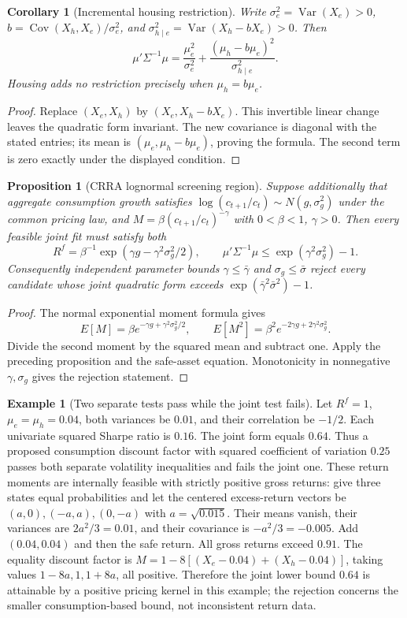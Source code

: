 \documentclass[11pt]{article}
\newtheorem{proposition}{Proposition}
\newtheorem{corollary}{Corollary}
\theoremstyle{definition}
\newtheorem{example}{Example}
\begin{document}
\begin{corollary}[Incremental housing restriction]
Write $\sigma_e^2=\operatorname{Var}(X_e)>0$, $b=\operatorname{Cov}(X_h,X_e)/\sigma_e^2$, and $\sigma_{h\mid e}^2=\operatorname{Var}(X_h-bX_e)>0$. Then
\[
 \mu'\Sigma^{-1}\mu
 =\frac{\mu_e^2}{\sigma_e^2}
   +\frac{(\mu_h-b\mu_e)^2}{\sigma_{h\mid e}^2}.
\]
Housing adds no restriction precisely when $\mu_h=b\mu_e$.
\end{corollary}
\begin{proof}
Replace $(X_e,X_h)$ by $(X_e,X_h-bX_e)$. This invertible linear change leaves the quadratic form invariant. The new covariance is diagonal with the stated entries; its mean is $(\mu_e,\mu_h-b\mu_e)$, proving the formula. The second term is zero exactly under the displayed condition.
\end{proof}

\begin{proposition}[CRRA lognormal screening region]
Suppose additionally that aggregate consumption growth satisfies $\log(c_{t+1}/c_t)\sim N(g,\sigma_g^2)$ under the common pricing law, and $M=\beta(c_{t+1}/c_t)^{-\gamma}$ with $0<\beta<1$, $\gamma>0$. Then every feasible joint fit must satisfy both
\[
 R^f=\beta^{-1}\exp(\gamma g-\gamma^2\sigma_g^2/2),
 \qquad
 \mu'\Sigma^{-1}\mu\leq\exp(\gamma^2\sigma_g^2)-1.
\]
Consequently independent parameter bounds $\gamma\leq\bar\gamma$ and $\sigma_g\leq\bar\sigma$ reject every candidate whose joint quadratic form exceeds $\exp(\bar\gamma^2\bar\sigma^2)-1$.
\end{proposition}
\begin{proof}
The normal exponential moment formula gives
\[
 E[M]=\beta e^{-\gamma g+\gamma^2\sigma_g^2/2},\qquad
 E[M^2]=\beta^2e^{-2\gamma g+2\gamma^2\sigma_g^2}.
\] Divide the second moment by the squared mean and subtract one. Apply the preceding proposition and the safe-asset equation. Monotonicity in nonnegative $\gamma,\sigma_g$ gives the rejection statement.
\end{proof}

\begin{example}[Two separate tests pass while the joint test fails]
Let $R^f=1$, $\mu_e=\mu_h=0.04$, both variances be $0.01$, and their correlation be $-1/2$. Each univariate squared Sharpe ratio is $0.16$. The joint form equals $0.64$. Thus a proposed consumption discount factor with squared coefficient of variation $0.25$ passes both separate volatility inequalities and fails the joint one.
These return moments are internally feasible with strictly positive gross returns: give three states equal probabilities and let the centered excess-return vectors be $(a,0),(-a,a),(0,-a)$ with $a=\sqrt{0.015}$. Their means vanish, their variances are $2a^2/3=0.01$, and their covariance is $-a^2/3=-0.005$. Add $(0.04,0.04)$ and then the safe return. All gross returns exceed $0.91$. The equality discount factor is $M=1-8[(X_e-0.04)+(X_h-0.04)]$, taking values $1-8a,1,1+8a$, all positive. Therefore the joint lower bound $0.64$ is attainable by a positive pricing kernel in this example; the rejection concerns the smaller consumption-based bound, not inconsistent return data.
\end{example}
\end{document}
